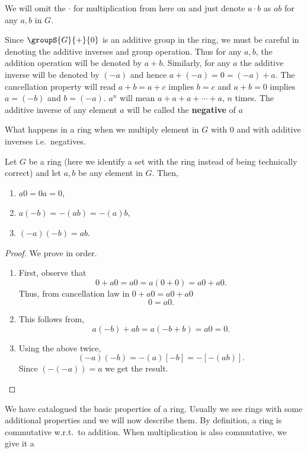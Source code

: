 \begin{Remark}
    We will omit the $\cdot$ for multiplication from here on and just denote $a\cdot b$ as $ab$ for any $a,b$
    in $G$.
\end{Remark}
\begin{Remark}
    Since $\groupS{G}{+}{0}$ is an additive group in the ring, we must be careful in denoting the additive
    inverses and group operation. Thus for any $a,b$, the addition operation will be denoted by $a + b$.
    Similarly, for any $a$ the additive inverse will be denoted by $(-a)$ and hence $a + (-a) = 0 = (-a) + a$.
    The cancellation property will read $a + b = a + c$ implies $b = c$ and $a + b = 0$ implies $a = (-b)$ and
    $b = (-a)$. $a^n$ will mean $a + a + a + \cdots + a$, $n$ times. The additive inverse of any element $a$
    will be called the \textbf{negative} of $a$
\end{Remark}
What happens in a ring when we multiply element in $G$ with $0$ and with additive inverses i.e.~negatives.
\begin{Proposition}
    Let $G$ be a ring (here we identify a set with the ring instead of being technically correct) and let
    $a,b$ be any element in $G$. Then,
    \begin{enumerate}
	\item
	    $a0 = 0a = 0$,
	\item
	    $a(-b) = -(ab) = -(a)b$, 
	\item
	    $(-a)(-b) = ab$.
    \end{enumerate}
\end{Proposition}
\begin{proof}
    We prove in order.
    \begin{enumerate}
	\item
	    First, observe that
	    \[0 + a0 = a0 = a(0 + 0) = a0 + a0.\]
	    Thus, from cancellation law in $0 + a0 = a0 + a0$
	    \[0 = a0.\]
	\item
	    This follows from,
	    \[a(-b) + ab = a(-b + b) = a0 = 0.\]

	\item
	    Using the above twice,
	    \[(-a)(-b) = -(a)\left[-b\right] = -\left[-(ab)\right].\]
	    Since $(-(-a)) = a$ we get the result.
    \end{enumerate}
\end{proof}
We have catalogued the basic properties of a ring. Usually we see rings with some additional properties and we
will now describe them.
By definition, a ring is commutative w.r.t.~to addition. When multiplication is also commutative, we give it a
